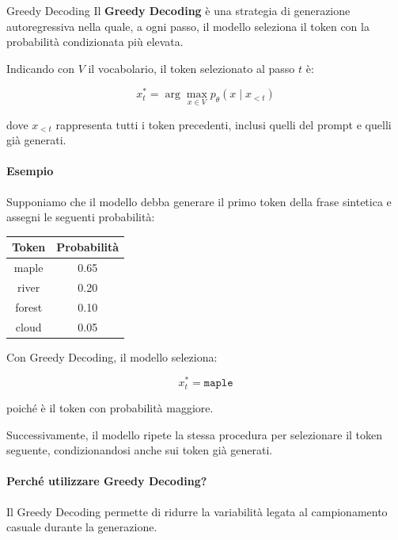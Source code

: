 \begin{definition}{Greedy Decoding}
    Il \textbf{Greedy Decoding} è una strategia
    di generazione autoregressiva nella quale,
    a ogni passo, il modello seleziona
    il token con la probabilità condizionata
    più elevata.

    Indicando con $V$ il vocabolario,
    il token selezionato al passo $t$ è:

    \begin{equation}
        x_t^*
        =
        \arg\max_{x \in V}
        p_{\theta}(x \mid x_{<t})
    \end{equation}

    dove $x_{<t}$ rappresenta tutti
    i token precedenti, inclusi quelli
    del prompt e quelli già generati.
\end{definition}

\paragraph{Esempio}

Supponiamo che il modello debba generare
il primo token della frase sintetica
e assegni le seguenti probabilità:

\begin{center}
\begin{tabular}{|c|c|}
\hline
\textbf{Token} & \textbf{Probabilità} \\
\hline
maple & 0.65 \\
river & 0.20 \\
forest & 0.10 \\
cloud & 0.05 \\
\hline
\end{tabular}
\end{center}

Con Greedy Decoding, il modello seleziona:

\[
x_t^* = \texttt{maple}
\]

poiché è il token con probabilità maggiore.

Successivamente, il modello ripete
la stessa procedura per selezionare
il token seguente, condizionandosi
anche sui token già generati.

\paragraph{Perché utilizzare Greedy Decoding?}

Il Greedy Decoding permette di ridurre
la variabilità legata al campionamento
casuale durante la generazione.

